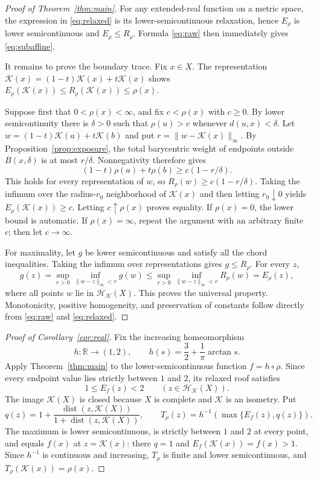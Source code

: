 \documentclass[11pt]{article}
\newcommand{\R}{\mathbb R}
\newcommand{\K}{\mathcal K}
\newcommand{\Hh}{\mathcal H}
\begin{document}
\begin{proof}[Proof of Theorem~\ref{thm:main}]
For any extended-real function on a metric space, the expression in
\eqref{eq:relaxed} is its lower-semicontinuous relaxation, hence $E_\rho$ is
lower semicontinuous and $E_\rho\le R_\rho$.  Formula \eqref{eq:raw} then
immediately gives \eqref{eq:subaffine}.

It remains to prove the boundary trace.  Fix $x\in X$.  The representation
$\K(x)=(1-t)\K(x)+t\K(x)$ shows
$E_\rho(\K(x))\le R_\rho(\K(x))\le\rho(x)$.

Suppose first that $0<\rho(x)<\infty$, and fix $c<\rho(x)$ with $c\ge0$.
By lower semicontinuity there is $\delta>0$ such that
$\rho(u)>c$ whenever $d(u,x)<\delta$.  Let
$w=(1-t)\K(a)+t\K(b)$ and put $r=\|w-\K(x)\|_\infty$.
By Proposition~\ref{prop:exposure}, the total barycentric weight of endpoints
outside $B(x,\delta)$ is at most $r/\delta$.  Nonnegativity therefore gives
\[
 (1-t)\rho(a)+t\rho(b)\ge c(1-r/\delta).
\]
This holds for every representation of $w$, so
$R_\rho(w)\ge c(1-r/\delta)$.  Taking the infimum over the radius-$r_0$
neighborhood of $\K(x)$ and then letting $r_0\downarrow0$ yields
$E_\rho(\K(x))\ge c$.  Letting $c\uparrow\rho(x)$ proves equality.  If
$\rho(x)=0$, the lower bound is automatic.  If $\rho(x)=\infty$, repeat the
argument with an arbitrary finite $c$; then let $c\to\infty$.

For maximality, let $g$ be lower semicontinuous and satisfy all the chord
inequalities.  Taking the infimum over representations gives $g\le R_\rho$.
For every $z$,
\[
g(z)=\sup_{r>0}\inf_{\|w-z\|_\infty<r}g(w)
\le \sup_{r>0}\inf_{\|w-z\|_\infty<r}R_\rho(w)=E_\rho(z),
\]
where all points $w$ lie in $\Hh_{\K}(X)$.  This proves the universal
property.  Monotonicity, positive homogeneity, and preservation of constants
follow directly from \eqref{eq:raw} and \eqref{eq:relaxed}.
\end{proof}

\begin{proof}[Proof of Corollary~\ref{cor:real}]
Fix the increasing homeomorphism
\[
h:\R\longrightarrow(1,2),\qquad
h(s)=\frac32+\frac1\pi\arctan s.
\]
Apply Theorem~\ref{thm:main} to the lower-semicontinuous function
$f=h\circ\rho$.  Since every endpoint value lies strictly between $1$ and
$2$, its relaxed roof satisfies
\[
1\le E_f(z)<2\qquad(z\in\Hh_{\K}(X)).
\]
The image $\K(X)$ is closed because $X$ is complete and $\K$ is an isometry.
Put
\[
q(z)=1+\frac{\operatorname{dist}(z,\K(X))}
                 {1+\operatorname{dist}(z,\K(X))},
\qquad
T_\rho(z)=h^{-1}\!\left(\max\{E_f(z),q(z)\}\right).
\]
The maximum is lower semicontinuous, is strictly between $1$ and $2$ at every
point, and equals $f(x)$ at $z=\K(x)$: there $q=1$ and
$E_f(\K(x))=f(x)>1$.  Since $h^{-1}$ is continuous and increasing,
$T_\rho$ is finite and lower semicontinuous, and
$T_\rho(\K(x))=\rho(x)$.
\end{proof}
\end{document}
